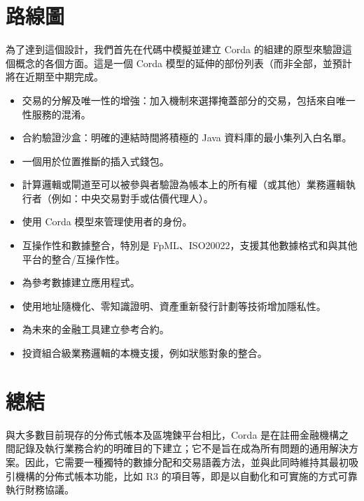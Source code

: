 ﻿\documentclass{article}
\begin{document}



\section{路線圖}
為了達到這個設計，我們首先在代碼中模擬並建立 Corda 的組建的原型來驗證這個概念的各個方面。這是一個 Corda 模型的延伸的部份列表（而非全部，並預計將在近期至中期完成。
\begin{itemize}	
\item 交易的分解及唯一性的增強：加入機制來選擇掩蓋部分的交易，包括來自唯一性服務的混淆。
\item 合約驗證沙盒：明確的連結時間將積極的 Java 資料庫的最小集列入白名單。
\item 一個用於位置推斷的插入式錢包。
\item 計算邏輯或閘道至可以被參與者驗證為帳本上的所有權（或其他）業務邏輯執行者（例如：中央交易對手或估價代理人）。
\item	使用 Corda 模型來管理使用者的身份。
\item 互操作性和數據整合，特別是 FpML、ISO20022，支援其他數據格式和與其他平台的整合/互操作性。
\item	為參考數據建立應用程式。
\item	使用地址隨機化、零知識證明、資產重新發行計劃等技術增加隱私性。
\item	為未來的金融工具建立參考合約。
\item 投資組合級業務邏輯的本機支援，例如狀態對象的整合。
\end{itemize}
\section{總結}
與大多數目前現存的分佈式帳本及區塊鍊平台相比，Corda 是在註冊金融機構之間記錄及執行業務合約的明確目的下建立；它不是旨在成為所有問題的通用解決方案。因此，它需要一種獨特的數據分配和交易語義方法，並與此同時維持其最初吸引機構的分佈式帳本功能，比如 R3 的項目等，即是以自動化和可實施的方式可靠執行財務協議。


\end{document}

